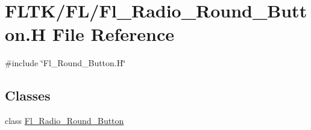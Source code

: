 \hypertarget{_fl___radio___round___button_8_h}{}\section{F\+L\+T\+K/\+F\+L/\+Fl\+\_\+\+Radio\+\_\+\+Round\+\_\+\+Button.H File Reference}
\label{_fl___radio___round___button_8_h}
{\ttfamily \#include \char`\"{}Fl\+\_\+\+Round\+\_\+\+Button.\+H\char`\"{}}\newline
\subsection*{Classes}
\begin{DoxyCompactItemize}
\item 
class \hyperlink{class_fl___radio___round___button}{Fl\+\_\+\+Radio\+\_\+\+Round\+\_\+\+Button}
\end{DoxyCompactItemize}
